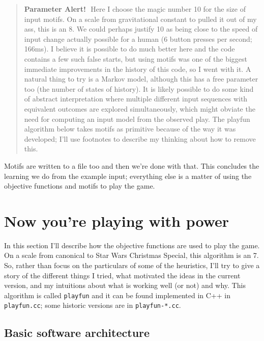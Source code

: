 \documentclass[twocolumn]{article}
\newcommand\parameteralert[1]{
  \begin{quotation}
  {\bf Parameter Alert!}\,\, #1
  \end{quotation}
}
\begin{document}
\parameteralert{Here I choose the magic number 10 for the size of input
  motifs. On a scale from gravitational constant to pulled it out of
  my ass, this is an 8. We could perhaps justify 10 as being close to
  the speed of input change actually possible for a human (6 button
  presses per second; 166ms). I believe it is possible to do much
  better here and the code contains a few such false starts, but using
  motifs was one of the biggest immediate improvements in the history
  of this code, so I went with it. A natural thing to try is a Markov
  model, although this has a free parameter too (the number of states
  of history). It is likely possible to do some kind of abstract
  interpretation where multiple different input sequences with
  equivalent outcomes are explored simultaneously, which might obviate
  the need for computing an input model from the observed play. The
  playfun algorithm below takes motifs as primitive because of the way
  it was developed; I'll use footnotes to describe my thinking about
  how to remove this.}

Motifs are written to a file too and then we're done with that. This
concludes the learning we do from the example input; everything else
is a matter of using the objective functions and motifs to play the
game.

\section{Now you're playing with power} \label{sec:playfun}

In this section I'll describe how the objective functions are used to
play the game. On a scale from canonical to Star Wars Christmas
Special, this algorithm is an 7. So, rather than focus on the
particulars of some of the heuristics, I'll try to give a story of the
different things I tried, what motivated the ideas in the current
version, and my intuitions about what is working well (or not) and
why. This algorithm is called {\tt playfun} and it can be found
implemented in C++ in {\tt playfun.cc}; some historic versions are
in {\tt playfun-*.cc}.

\subsection{Basic software architecture}
\end{document}
